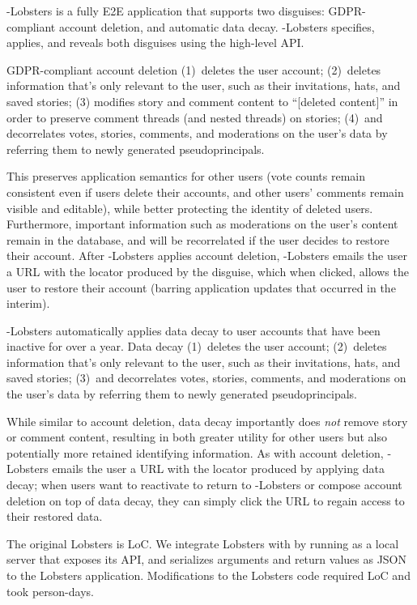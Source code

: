 \sys-Lobsters is a fully E2E application that supports two disguises: GDPR-compliant account
deletion, and automatic data decay.  \sys-Lobsters specifies, applies, and reveals both disguises
using the high-level \sys API.

GDPR-compliant account deletion 
%
(1)~deletes the user account;
%
(2)~deletes information that's only relevant to the user, such as their invitations, hats, and saved
stories;
%
(3) modifies story and comment content to ``[deleted content]'' in order to preserve comment threads
(and nested threads) on stories;
%
(4)~and decorrelates votes, stories, comments, and moderations on the user's data by referring them
to newly generated pseudoprincipals.
%

This preserves application semantics for other users (\eg vote counts remain consistent even if
users delete their accounts, and other users' comments remain visible and editable), while better
protecting the identity of deleted users.  Furthermore, important information such as moderations on
the user's content remain in the database, and will be recorrelated if the user decides to restore
their account.  After \sys-Lobsters applies account deletion, \sys-Lobsters emails the user a URL with the
locator produced by the disguise, which when clicked, allows the user to restore their account
(barring application updates that occurred in the interim).

\sys-Lobsters automatically applies data decay to user accounts that have been inactive for over a year.
Data decay 
%
(1)~deletes the user account;
%
(2)~deletes information that's only relevant to the user, such as their invitations, hats, and saved
stories;
%
(3)~and decorrelates votes, stories, comments, and moderations on the user's data by referring them
to newly generated pseudoprincipals.
%

While similar to account deletion, data decay importantly does \emph{not} remove story or comment
content, resulting in both greater utility for other users but also potentially more retained
identifying information.  As with account deletion, \sys-Lobsters emails the user a URL with the locator
produced by applying data decay; when users want to reactivate to return to \sys-Lobsters or compose
account deletion on top of data decay, they can simply click the URL to regain access to their
restored data.

The original Lobsters is LoC. We integrate Lobsters with \sys by running \sys as a local
server that exposes its API, and serializes arguments and return values as JSON to the Lobsters
application.
Modifications to the Lobsters code required LoC and took  person-days.

